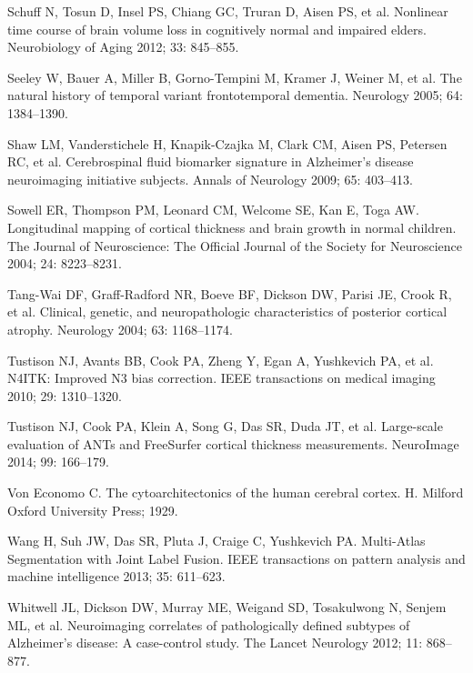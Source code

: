 \documentclass[]{article}
\begin{document}
\hypertarget{ref-schuff_nonlinear_2012}{}
Schuff N, Tosun D, Insel PS, Chiang GC, Truran D, Aisen PS, et al.
Nonlinear time course of brain volume loss in cognitively normal and
impaired elders. Neurobiology of Aging 2012; 33: 845--855.

\hypertarget{ref-seeley_natural_2005}{}
Seeley W, Bauer A, Miller B, Gorno-Tempini M, Kramer J, Weiner M, et al.
The natural history of temporal variant frontotemporal dementia.
Neurology 2005; 64: 1384--1390.

\hypertarget{ref-shaw_cerebrospinal_2009}{}
Shaw LM, Vanderstichele H, Knapik-Czajka M, Clark CM, Aisen PS, Petersen
RC, et al. Cerebrospinal fluid biomarker signature in Alzheimer's
disease neuroimaging initiative subjects. Annals of Neurology 2009; 65:
403--413.

\hypertarget{ref-sowell_longitudinal_2004}{}
Sowell ER, Thompson PM, Leonard CM, Welcome SE, Kan E, Toga AW.
Longitudinal mapping of cortical thickness and brain growth in normal
children. The Journal of Neuroscience: The Official Journal of the
Society for Neuroscience 2004; 24: 8223--8231.

\hypertarget{ref-tang-wai_clinical_2004}{}
Tang-Wai DF, Graff-Radford NR, Boeve BF, Dickson DW, Parisi JE, Crook R,
et al. Clinical, genetic, and neuropathologic characteristics of
posterior cortical atrophy. Neurology 2004; 63: 1168--1174.

\hypertarget{ref-tustison_n4itk:_2010}{}
Tustison NJ, Avants BB, Cook PA, Zheng Y, Egan A, Yushkevich PA, et al.
N4ITK: Improved N3 bias correction. IEEE transactions on medical imaging
2010; 29: 1310--1320.

\hypertarget{ref-tustison_large-scale_2014}{}
Tustison NJ, Cook PA, Klein A, Song G, Das SR, Duda JT, et al.
Large-scale evaluation of ANTs and FreeSurfer cortical thickness
measurements. NeuroImage 2014; 99: 166--179.

\hypertarget{ref-von_economo_cytoarchitectonics_1929}{}
Von Economo C. The cytoarchitectonics of the human cerebral cortex. H.
Milford Oxford University Press; 1929.

\hypertarget{ref-wang_multi-atlas_2013}{}
Wang H, Suh JW, Das SR, Pluta J, Craige C, Yushkevich PA. Multi-Atlas
Segmentation with Joint Label Fusion. IEEE transactions on pattern
analysis and machine intelligence 2013; 35: 611--623.

\hypertarget{ref-whitwell_neuroimaging_2012}{}
Whitwell JL, Dickson DW, Murray ME, Weigand SD, Tosakulwong N, Senjem
ML, et al. Neuroimaging correlates of pathologically defined subtypes of
Alzheimer's disease: A case-control study. The Lancet Neurology 2012;
11: 868--877.
\end{document}
